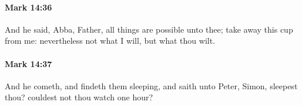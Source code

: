 		\paragraph{Mark 14:36} %
			\label{MARK-14-36}

			And he said, Abba, Father, all things are possible unto thee; take away this cup from me: nevertheless not what I will, but what thou wilt.

			\begin{framed}
			\scriptsize
				\begin{compactdesc}
					\item[SBLG] 
				\end{compactdesc}
			\end{framed}

		\paragraph{Mark 14:37} %
			\label{MARK-14-37}

			And he cometh, and findeth them sleeping, and saith unto Peter, Simon, sleepest thou? couldest not thou watch one hour?

